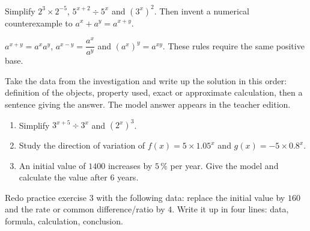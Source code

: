 \begin{activite}
Simplify $2^3\times2^{-5}$, $5^{x+2}\div5^x$ and $(3^x)^2$. Then invent a numerical counterexample to $a^x+a^y=a^{x+y}$.

\end{activite}

\begin{traceecrite}$a^{x+y}=a^xa^y$, $a^{x-y}=\dfrac{a^x}{a^y}$ and $(a^x)^y=a^{xy}$. These rules require the same positive base.\end{traceecrite}

\begin{exemple}
Take the data from the investigation and write up the solution in this order: definition of the objects, property used, exact or approximate calculation, then a sentence giving the answer. The model answer appears in the teacher edition.
\end{exemple}

\begin{exercice}[-- essential]
\begin{enumerate}\item Simplify $3^{x+5}\div3^x$ and $(2^x)^3$.\item Study the direction of variation of $f(x)=5\times1.05^x$ and $g(x)=-5\times0.8^x$.\item An initial value of $1400$ increases by $5\,\%$ per year. Give the model and calculate the value after $6$ years.\end{enumerate}
\end{exercice}


\begin{dm}Redo practice exercise 3 with the following data: replace the initial value by $160$ and the rate or common difference/ratio by $4$. Write it up in four lines: data, formula, calculation, conclusion.\end{dm}

